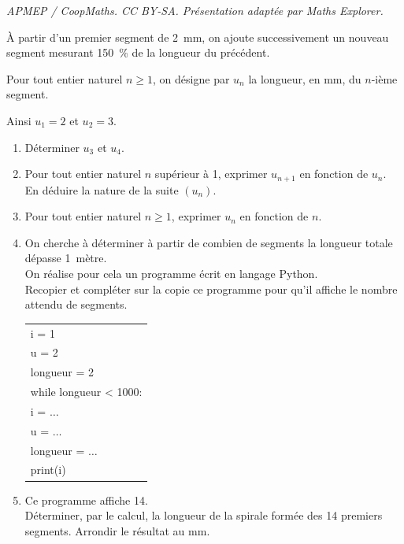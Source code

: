 \documentclass[10pt]{article}
\begin{document}
\noindent\textit{APMEP / CoopMaths. CC BY-SA. Présentation adaptée par Maths Explorer.}\par\medskip
\medskip
À partir d'un premier segment de \qty{2}{\mm}, on ajoute successivement un nouveau segment mesurant \qty{150}{\percent}
de la longueur du précédent.

Pour tout entier naturel $n\geqslant1$, on désigne par $u_n$ la longueur, en mm, du $n$-ième segment.

Ainsi $u_1=2$ et $u_2=3$.
\begin{enumerate}
\item Déterminer $u_3$ et $u_4$.
\item Pour tout entier naturel $n$ supérieur à 1, exprimer $u_{n+1}$ en fonction de $u_n$.\\
En déduire la nature de la suite $(u_n)$.
\item Pour tout entier naturel $n\geqslant1$, exprimer $u_n$ en fonction de $n$.
\item On cherche à déterminer à partir de combien de segments la longueur totale dépasse 1~mètre.\hspace*{-8.5pt}\\
On réalise pour cela un programme écrit en langage \textsf{Python}.\\
Recopier et compléter sur la copie ce programme pour qu'il affiche le nombre attendu de segments.

\begin{center}
\begin{tabular}[]{|l|}
\hline
i = 1\\
u = 2\\
longueur = 2\\
while longueur < 1000:\\
\hspace{1.3em}	i = $\dots$\\
\hspace{1.3em}	u = $\dots$\\
\hspace{1.3em}	longueur = $\dots$\\
print(i)\\
\hline
\end{tabular}
\end{center}

\item Ce programme affiche 14.\\
Déterminer, par le calcul, la longueur de la spirale formée des 14 premiers segments. Arrondir le
résultat au mm.
\end{enumerate}

\medskip
\end{document}
